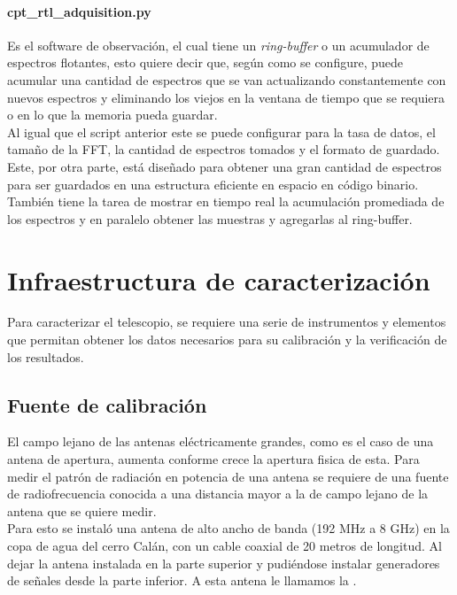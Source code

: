 \paragraph{cpt\_rtl\_adquisition.py} Es el software de observación, el cual tiene un \textit{ring-buffer} o un acumulador de espectros flotantes, esto quiere decir que, según como se configure, puede acumular una cantidad de espectros que se van actualizando constantemente con nuevos espectros y eliminando los viejos en la ventana de tiempo que se requiera o en lo que la memoria pueda guardar.\\

Al igual que el script anterior este se puede configurar para la tasa de datos, el tamaño de la FFT, la cantidad de espectros tomados y el formato de guardado. Este, por otra parte, está diseñado para obtener una gran cantidad de espectros para ser guardados en una estructura eficiente en espacio en código binario. También tiene la tarea de mostrar en tiempo real la acumulación promediada de los espectros y en paralelo obtener las muestras y agregarlas al ring-buffer.\\


\section{Infraestructura de caracterización}

Para caracterizar el telescopio, se requiere una serie de instrumentos y elementos que permitan obtener los datos necesarios para su calibración y la verificación de los resultados.\\

\subsection{Fuente de calibración} \label{estrellaCal}

El campo lejano de las antenas eléctricamente grandes, como es el caso de una antena de apertura, aumenta conforme crece la apertura fisica de esta. Para medir el patrón de radiación en potencia de una antena se requiere de una fuente de radiofrecuencia conocida a una distancia mayor a la de campo lejano de la antena que se quiere medir.\\

Para esto se instaló una antena de alto ancho de banda (192 MHz a 8 GHz) en la copa de agua del cerro Calán, con un cable coaxial de 20 metros de longitud. Al dejar la antena instalada en la parte superior y pudiéndose instalar generadores de señales desde la parte inferior. A esta antena le llamamos la .\\

